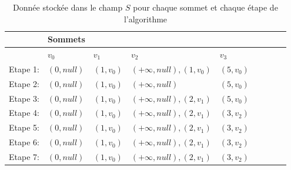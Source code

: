 \begin{exemple}
\begin{figure}[ht!]
\end{figure}

	
\setlength{\overfullrule}{0pt}

\begin{table}[]
	
\caption{Donnée stockée dans le champ $S$ pour chaque sommet et chaque étape de l'algorithme}
\label{tab:filePrior}

\begin{tabular}{l|l|l|l|l|l|l|l|l|}
\cline{2-5}
                               & Sommets &    &    &      \\ \hline
\multicolumn{1}{|l|}{}         & $v_{0}$ &$v_{1}$  & $v_{2}$ &$v_{3}$  \\ \hline
\multicolumn{1}{|l|}{Etape 1:} & $(0,null)$   &$(1,v_{0})$     &$(+\infty,null),(1,v_{0})$        &$(5,v_{0})$    \\ \hline
\multicolumn{1}{|l|}{Etape 2:} &$(0,null)$         &$(1,v_{0})$    &$(+\infty,null)$              &$(5,v_{0})$     \\ \hline
\multicolumn{1}{|l|}{Etape 3:} &$(0,null)$         &$(1,v_{0})$    &$(+\infty,null),(2,v_{1})$    &$(5,v_{0})$  \\ \hline
\multicolumn{1}{|l|}{Etape 4:} &$(0,null)$         &$(1,v_{0})$    &$(+\infty,null),(2,v_{1})$    &$(3,v_{2})$   \\ \hline
\multicolumn{1}{|l|}{Etape 5:}   &$(0, null)$         &$(1,v_{0})$    &$(+\infty,null),(2,v_{1})$    &$(3,v_{2})$    \\ \hline 
\multicolumn{1}{|l|}{Etape 6:}   &$(0,null)$         &$(1,v_{0})$    &$(+\infty,null),(2,v_{1})$    &$(3,v_{2})$     \\ \hline
\multicolumn{1}{|l|}{Etape 7:}   &$(0, null)$         &$(1,v_{0})$    &$(+\infty,null),(2,v_{1})$    &$(3,v_{2})$   \\ \hline


\end{tabular}
\end{table}
\end{exemple}
